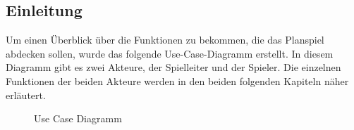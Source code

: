 \subsection{Einleitung}
\label{sec:fachkonzept-usecase-einleitung}

Um einen Überblick über die Funktionen zu bekommen, die das Planspiel abdecken sollen, wurde das folgende Use-Case-Diagramm erstellt. In diesem Diagramm gibt es zwei Akteure, der Spielleiter und der Spieler. Die einzelnen Funktionen der beiden Akteure werden in den beiden folgenden Kapiteln näher erläutert.

\begin{figure}[h]
  \centering
  \caption{Use Case Diagramm}
  \label{img:fachkonzept-usecase}
\end{figure}

\autorende{}